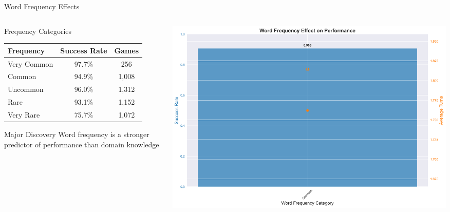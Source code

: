 \documentclass[aspectratio=169]{beamer}
\begin{document}
\begin{frame}{Word Frequency Effects}
\begin{columns}[c]
\begin{column}{0.5\textwidth}
\begin{block}{Frequency Categories}
\begin{center}
\begin{tabular}{lcc}
\toprule
\textbf{Frequency} & \textbf{Success Rate} & \textbf{Games} \\
\midrule
Very Common & 97.7\% & 256 \\
Common & 94.9\% & 1,008 \\
Uncommon & 96.0\% & 1,312 \\
Rare & 93.1\% & 1,152 \\
Very Rare & 75.7\% & 1,072 \\
\bottomrule
\end{tabular}
 \end{center}
 \end{block}
 
 \begin{alertblock}{Major Discovery}
 Word frequency is a stronger predictor of performance than domain knowledge
 \end{alertblock}
 \end{column}
 
 \begin{column}{0.48\textwidth}
 \begin{center}
 \includegraphics[width=\textwidth]{presentation_figures/figure5_frequency_effect.png}
 \end{center}
 \end{column}
 \end{columns}
 \end{frame}
\end{document}
